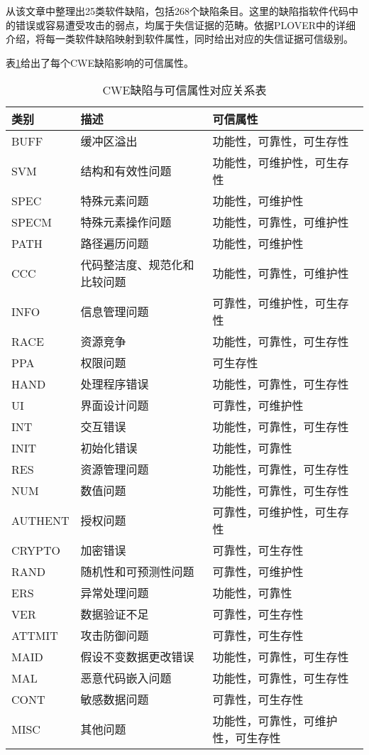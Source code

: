 从该文章中整理出25类软件缺陷，包括268个缺陷条目。这里的缺陷指软件代码中的错误或容易遭受攻击的弱点，均属于失信证据的范畴。依据PLOVER中的详细介绍，将每一类软件缺陷映射到软件属性，同时给出对应的失信证据可信级别。

表\ref{tab:CWEAttr}给出了每个CWE缺陷影响的可信属性。
\begin{table}[htbp]
\caption{CWE缺陷与可信属性对应关系表}
\begin{tabular}{|l|l|l|}
\hline
类别 & 描述 & 可信属性 \\
\hline
BUFF & 缓冲区溢出 & 功能性，可靠性，可生存性 \\
\hline
SVM & 结构和有效性问题 & 功能性，可维护性，可生存性 \\
\hline
SPEC & 特殊元素问题 & 功能性，可维护性 \\
\hline
SPECM & 特殊元素操作问题 & 功能性，可靠性，可维护性 \\
\hline
PATH & 路径遍历问题 & 功能性，可维护性 \\
\hline
CCC & 代码整洁度、规范化和比较问题 & 功能性，可靠性，可维护性 \\
\hline
INFO & 信息管理问题 & 可靠性，可维护性，可生存性 \\
\hline
RACE & 资源竞争 & 功能性，可靠性，可生存性 \\
\hline
PPA & 权限问题 & 可生存性 \\
\hline
HAND & 处理程序错误 & 功能性，可靠性，可生存性 \\
\hline
UI & 界面设计问题 & 可靠性，可维护性 \\
\hline
INT & 交互错误 & 功能性，可靠性，可生存性 \\
\hline
INIT & 初始化错误 & 功能性，可靠性 \\
\hline
RES & 资源管理问题 & 功能性，可靠性，可生存性 \\
\hline
NUM & 数值问题 & 功能性，可靠性，可生存性 \\
\hline
AUTHENT & 授权问题 & 可靠性，可维护性，可生存性 \\
\hline
CRYPTO & 加密错误 & 可靠性，可生存性 \\
\hline
RAND & 随机性和可预测性问题 & 可靠性，可维护性 \\
\hline
ERS & 异常处理问题 & 功能性，可靠性 \\
\hline
VER & 数据验证不足 & 可靠性，可生存性 \\
\hline
ATTMIT & 攻击防御问题 & 可靠性，可生存性 \\
\hline
MAID & 假设不变数据更改错误 & 功能性，可靠性，可生存性 \\
\hline
MAL & 恶意代码嵌入问题 & 功能性，可靠性，可生存性 \\
\hline
CONT & 敏感数据问题 & 可靠性，可生存性 \\
\hline
MISC & 其他问题 & 功能性，可靠性，可维护性，可生存性 \\
\hline
\end{tabular}
\label{tab:CWEAttr}
\end{table}

